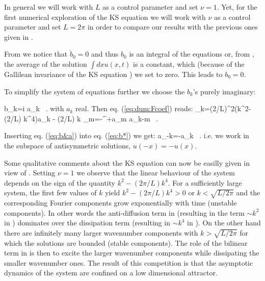 \documentclass[pre,preprint,groupedaddress,showpacs,showkeys]{revtex4}
\begin{document}
 In general we will work with $L$ as a control parameter and
 set $\nu=1$. Yet, for the first numerical exploration of the KS
 equation we will work with $\nu$ as a control parameter and set
 $L=2\pi$ in order to compare our results with the previous ones
 given in \cite{Christiansen:97}.

 From  we notice that $\dot{b}_0=0$ and thus $b_0$ is an integral
 of the equations or, from , the average of the solution $\int dx u(x,t)$
 is a constant, which (because of the Gallilean invariance of the KS
 equation \cite{Christiansen:97}) we set to zero. This leads to $b_0=0$.

 To simplify the system of equations further we choose the $b_k$'s
 purely imaginary:

 \beq
  b_k=i a_k \, .
  \label{eq:b&a}
 \eeq
 with $a_k$ real. Then eq. (\ref{eq:dum:Fcoef}) reads:
 \beq
  _k=\left(2\pi/L\right)^2(k^2- \left(2\pi/L\right) \nu k^4)a_k - (2\pi/L) k \sum_{m=-\infty}^{+\infty}a_m a_{k-m} \, .
  \label{eq:Fcoef}
 \eeq

 Inserting eq. (\ref{eq:b&a}) into eq. (\ref{eq:b*}) we get:
 \beq
  a_{-k}=-a_{k} \, .
  \label{eq:aNegative}
 \eeq
 i.e. we work in the subspace of antisymmetric solutions,
 $u(-x)=-u(x)$.

 Some qualitative comments about the KS equation can now be easilly
 given in view of . Setting $\nu=1$ we observe
 that the linear behaviour of the system depends on the sign of the
 quantity $k^2- \left(2\pi/L\right)  k^4$. For a sufficiently large
 system, the first few values of $k$ yield $k^2- \left(2\pi/L\right)
 k^4>0$ or $k<\sqrt{L/2\pi}$
 and the corresponding Fourier components grow exponentially
 with time (unstable components). In other words the anti-diffusion
 term in  (resulting in the term $\sim k^2$ in
 ) dominates over the dissipation term (resulting in
 $\sim k^4$ in ).  On the other hand there are infinitely many larger
 wavenumber components with $k>\sqrt{L/2\pi}$ for which the solutions
 are bounded (stable components). The role of the bilinear term in
  is then to excite the larger wavenumber components
 while dissipating the smaller wavenumber ones. The result of this
 competition is that the asymptotic dynamics of the system are
 confined on a low dimensional attractor.

\end{document}

